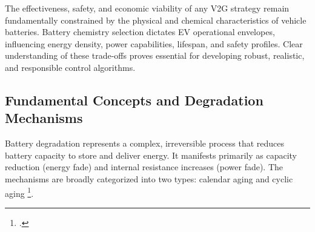 The effectiveness, safety, and economic viability of any V2G strategy remain fundamentally constrained by the physical and chemical characteristics of vehicle batteries. Battery chemistry selection dictates EV operational envelopes, influencing energy density, power capabilities, lifespan, and safety profiles. Clear understanding of these trade-offs proves essential for developing robust, realistic, and responsible control algorithms.

\subsection{Fundamental Concepts and Degradation Mechanisms}

Battery degradation represents a complex, irreversible process that reduces battery capacity to store and deliver energy. It manifests primarily as capacity reduction (energy fade) and internal resistance increases (power fade). The mechanisms are broadly categorized into two types: calendar aging and cyclic aging \footcite{birkl2017degradation}.

